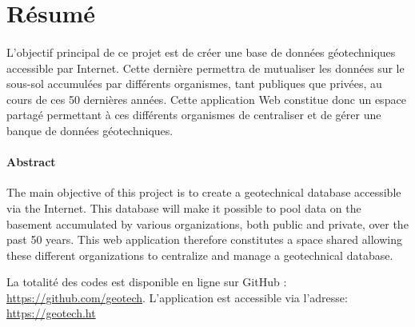\section{Résumé}
\paragraph{}
L'objectif principal de ce projet est de créer une base de données géotechni\-ques
 accessible par Internet. Cette dernière permettra de mutualiser les données 
 sur le sous-sol accumulées par différents organismes, tant publiques que privées, 
 au cours de ces 50 dernières années. Cette application Web constitue donc un espace 
 partagé permettant à ces différents organismes de centraliser et de gérer une banque 
 de données géotechniques.


\paragraph{Abstract}
The main objective of this project is to create a geotechnical 
database accessible via the Internet. This database will make it possible to pool data
 on the basement accumulated by various organizations, both public and private,
 over the past 50 years. This web application therefore constitutes a space
 shared allowing these different organizations to centralize and manage a
 geotechnical database.
\bigskip
\bigskip
\par
 {\footnotesize
 La totalité des codes est disponible en ligne sur GitHub : \url{https://github.com/geotech}.
L’application est accessible via l’adresse: \url{https://geotech.ht}

 }